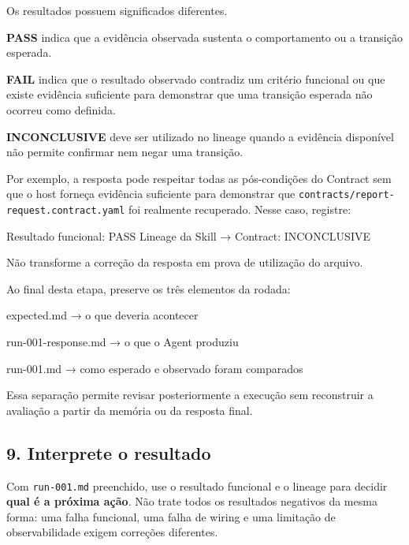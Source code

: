 \documentclass[
  10pt,
  a4paper,
  oneside]{book}
\newenvironment{Shaded}{}{}
\newcommand{\NormalTok}[1]{#1}
\renewenvironment{Shaded}{\begin{snugshade}}{\end{snugshade}}%
\begin{document}
Os resultados possuem significados diferentes.

\textbf{PASS} indica que a evidência observada sustenta o comportamento
ou a transição esperada.

\textbf{FAIL} indica que o resultado observado contradiz um critério
funcional ou que existe evidência suficiente para demonstrar que uma
transição esperada não ocorreu como definida.

\textbf{INCONCLUSIVE} deve ser utilizado no lineage quando a evidência
disponível não permite confirmar nem negar uma transição.

Por exemplo, a resposta pode respeitar todas as pós-condições do
Contract sem que o host forneça evidência suficiente para demonstrar que
\texttt{contracts/report-request.contract.yaml} foi realmente
recuperado. Nesse caso, registre:

\begin{Shaded}
\begin{Highlighting}[]
\NormalTok{Resultado funcional: PASS}
\NormalTok{Lineage da Skill → Contract: INCONCLUSIVE}
\end{Highlighting}
\end{Shaded}

Não transforme a correção da resposta em prova de utilização do arquivo.

Ao final desta etapa, preserve os três elementos da rodada:

\begin{Shaded}
\begin{Highlighting}[]
\NormalTok{expected.md}
\NormalTok{→ o que deveria acontecer}

\NormalTok{run{-}001{-}response.md}
\NormalTok{→ o que o Agent produziu}

\NormalTok{run{-}001.md}
\NormalTok{→ como esperado e observado foram comparados}
\end{Highlighting}
\end{Shaded}

Essa separação permite revisar posteriormente a execução sem reconstruir
a avaliação a partir da memória ou da resposta final.

\hypertarget{interprete-o-resultado}{%
\subsection{9. Interprete o resultado}\label{interprete-o-resultado}}

Com \texttt{run-001.md} preenchido, use o resultado funcional e o
lineage para decidir \textbf{qual é a próxima ação}. Não trate todos os
resultados negativos da mesma forma: uma falha funcional, uma falha de
wiring e uma limitação de observabilidade exigem correções diferentes.
\end{document}
